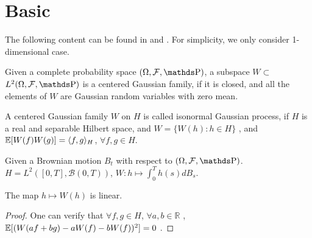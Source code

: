 \chapter{Basic}

The following content can be found in 
\parencite{TheMalliavinCalculusandRelatedTopics} and \newline
\parencite{IntroductiontoMalliavinCalculus}. 
For simplicity, we only consider 1-dimensional case. 

\begin{definition}
Given a complete probability space $(\Omega, \mathcal{F}, \Prob)$, 
a subspace $W \subset$ $L^2(\Omega, \mathcal{F}, \Prob)$ is a centered Gaussian family, if it is closed, and all the elements of $W$ are
Gaussian random variables with zero mean. 
\end{definition}


\begin{definition}
A centered Gaussian family $W$ on $H$ is called isonormal Gaussian process, 
if $H$ is a real and separable Hilbert space, 
and $W = \{W(h): h \in H \}$
, and $\operatorname{\mathbb{E}}[W(f)W(g)] = \langle f, g \rangle_{H}$, $\forall f, g \in H$. 
\end{definition}

\begin{example}
Given a Brownian motion $B_t$ with respect to $(\Omega, \mathcal{F}, \Prob)$. 
$H = L^2([0, T], \mathcal{B}(0, T))$, 
$W: h \mapsto \int_{0}^{T} h(s) d B_s$. 
\end{example}

\begin{property}
    The map $h \mapsto W(h)$ is linear. 
\end{property}

\begin{proof}
    One can verify that $\forall f, g \in H$, $\forall a, b \in \mathbb{R}$
    , $\operatorname{\mathbb{E}}[(W(af+bg) - aW(f) - bW(f))^2] = 0$ . 
\end{proof}
